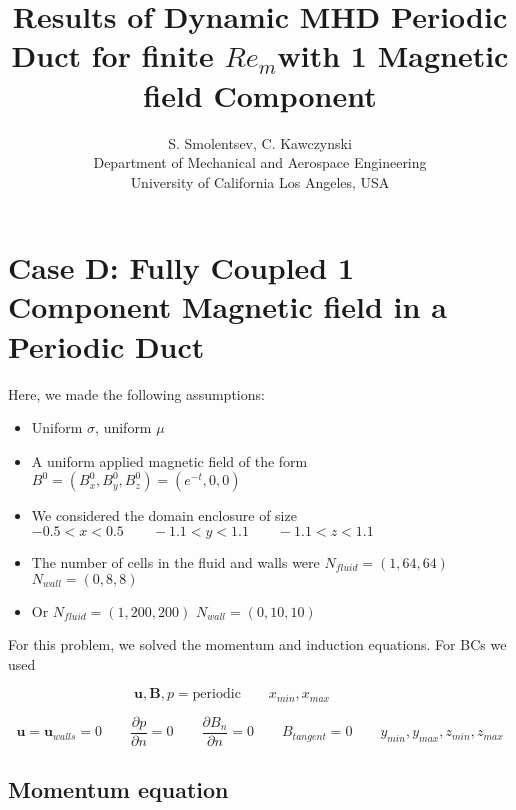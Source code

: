 \documentclass[11pt]{article}
\begin{document}
\doublespacing
\title{Results of Dynamic MHD Periodic Duct for finite
 \texorpdfstring{$Re_m$} \\ with 1 Magnetic field Component}
\author{S. Smolentsev, C. Kawczynski \\
Department of Mechanical and Aerospace Engineering \\
University of California Los Angeles, USA\\
}
\maketitle


\section{Case D: Fully Coupled 1 Component Magnetic field in a Periodic Duct}

Here, we made the following assumptions:

\begin{itemize}
\item Uniform $\sigma$, uniform $\mu$
\item A uniform applied magnetic field of the form $B^0 = (B_x^0,B_y^0,B_z^0) = (e^{-t},0,0)$
\item We considered the domain enclosure of size $-0.5 < x < 0.5 \qquad -1.1 < y < 1.1 \qquad -1.1 < z < 1.1$
\item The number of cells in the fluid and walls were $N_{fluid} = (1,64,64)$ \qquad $N_{wall} = (0,8,8)$
\item Or $N_{fluid} = (1,200,200)$ \qquad $N_{wall} = (0,10,10)$
\end{itemize}

For this problem, we solved the momentum and induction equations. For BCs we used

\begin{equation}
	\pmb{u},
	\pmb{B},
	p = \text{periodic}
	\qquad
	x_{min},x_{max}
	\qquad \qquad
\end{equation}

\begin{equation}
	\pmb{u} = \pmb{u}_{walls} = 0
	\qquad
	\frac{\partial p}{\partial n} = 0
	\qquad
	\frac{\partial B_{n}}{\partial n} = 0
	\qquad
	B_{tangent} = 0
	\qquad
	y_{min},y_{max},
	z_{min},z_{max}
\end{equation}

\subsection{Momentum equation}
\end{document}
